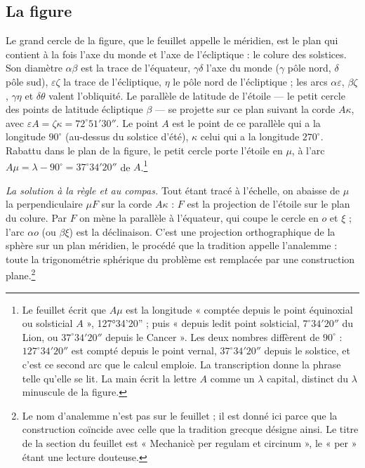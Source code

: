 \documentclass[11pt,a4paper]{article}
\begin{document}
\subsection*{La figure}

Le grand cercle de la figure, que le feuillet appelle le méridien, est le plan
qui contient à la fois l'axe du monde et l'axe de l'écliptique : le colure des
solstices. Son diamètre $\alpha\beta$ est la trace de l'équateur, $\gamma\delta$
l'axe du monde ($\gamma$ pôle nord, $\delta$ pôle sud), $\varepsilon\zeta$ la
trace de l'écliptique, $\eta$ le pôle nord de l'écliptique ; les arcs
$\alpha\varepsilon$, $\beta\zeta$, $\gamma\eta$ et $\delta\theta$ valent
l'obliquité. Le parallèle de latitude de l'étoile — le petit cercle des points
de latitude écliptique $\beta$ — se projette sur ce plan suivant la corde
$A\kappa$, avec $\varepsilon A = \zeta\kappa = 72^\circ 51' 30''$. Le point $A$
est le point de ce parallèle qui a la longitude $90^\circ$ (au-dessus du
solstice d'été), $\kappa$ celui qui a la longitude $270^\circ$. Rabattu dans le
plan de la figure, le petit cercle porte l'étoile en $\mu$, à l'arc
$A\mu = \lambda - 90^\circ = 37^\circ 34' 20''$ de $A$.\footnote{Le feuillet
écrit que $A\mu$ est la longitude « comptée depuis le point équinoxial ou
solsticial $A$ », 127°34'20'' ; puis « depuis ledit point solsticial,
$7^\circ 34' 20''$ du Lion, ou $37^\circ 34' 20''$ depuis le Cancer ». Les deux
nombres diffèrent de $90^\circ$ : $127^\circ 34' 20''$ est compté depuis le
point vernal, $37^\circ 34' 20''$ depuis le solstice, et c'est ce second arc
que le calcul emploie. La transcription donne la phrase telle qu'elle se lit.
La main écrit la lettre $A$ comme un $\lambda$ capital, distinct du $\lambda$
minuscule de la figure.}

\emph{La solution à la règle et au compas.} Tout étant tracé à l'échelle, on
abaisse de $\mu$ la perpendiculaire $\mu F$ sur la corde $A\kappa$ : $F$ est la
projection de l'étoile sur le plan du colure. Par $F$ on mène la parallèle à
l'équateur, qui coupe le cercle en $o$ et $\xi$ ; l'arc $\alpha o$ (ou
$\beta\xi$) est la déclinaison. C'est une projection orthographique de la
sphère sur un plan méridien, le procédé que la tradition appelle l'analemme :
toute la trigonométrie sphérique du problème est remplacée par une
construction plane.\footnote{Le nom d'analemme n'est pas sur le feuillet ; il
est donné ici parce que la construction coïncide avec celle que la tradition
grecque désigne ainsi. Le titre de la section du feuillet est « Mechanicè per
regulam et circinum », le « per » étant une lecture douteuse.}
\end{document}
